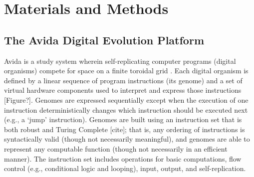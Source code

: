 

\section{Materials and Methods}

\subsection{The Avida Digital Evolution Platform}


Avida is a study system wherein self-replicating computer programs (digital organisms) compete for space on a finite toroidal grid \citep{ofria_avida:_2009}.
Each digital organism is defined by a linear sequence of program instructions (its genome) and a set of virtual hardware components used to interpret and express those instructions [Figure?].
Genomes are expressed sequentially except when the execution of one instruction deterministically changes which instruction should be executed next (e.g., a `jump' instruction). 
Genomes are built using an instruction set that is both robust and Turing Complete [cite]; that is, any ordering of instructions is syntactically valid (though not necessarily meaningful), and genomes are able to represent any computable function (though not necessarily in an efficient manner).
The instruction set includes operations for basic computations, flow control (e.g., conditional logic and looping), input, output, and self-replication.


